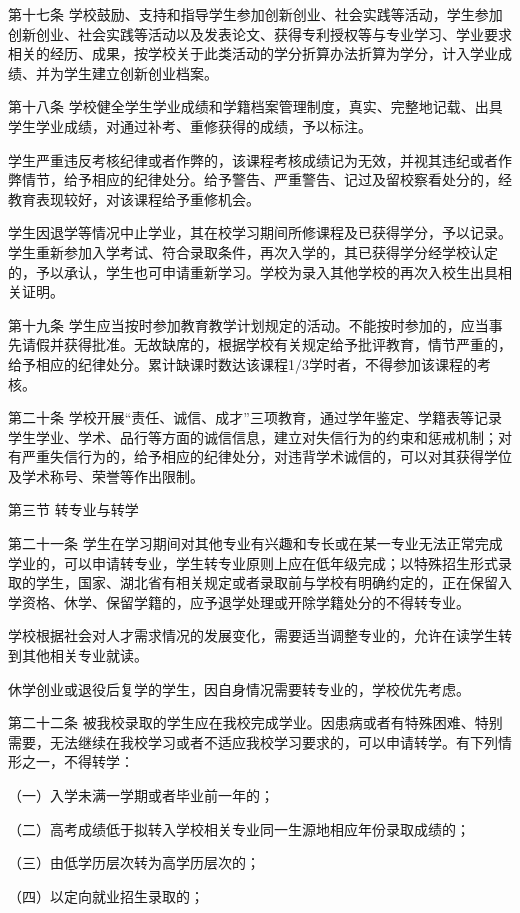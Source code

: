 \documentclass[UTF8,12pt,a4paper]{report}
\begin{document}
第十七条 学校鼓励、支持和指导学生参加创新创业、社会实践等活动，学生参加创新创业、社会实践等活动以及发表论文、获得专利授权等与专业学习、学业要求相关的经历、成果，按学校关于此类活动的学分折算办法折算为学分，计入学业成绩、并为学生建立创新创业档案。

第十八条 学校健全学生学业成绩和学籍档案管理制度，真实、完整地记载、出具学生学业成绩，对通过补考、重修获得的成绩，予以标注。

学生严重违反考核纪律或者作弊的，该课程考核成绩记为无效，并视其违纪或者作弊情节，给予相应的纪律处分。给予警告、严重警告、记过及留校察看处分的，经教育表现较好，对该课程给予重修机会。

学生因退学等情况中止学业，其在校学习期间所修课程及已获得学分，予以记录。学生重新参加入学考试、符合录取条件，再次入学的，其已获得学分经学校认定的，予以承认，学生也可申请重新学习。学校为录入其他学校的再次入校生出具相关证明。

第十九条 学生应当按时参加教育教学计划规定的活动。不能按时参加的，应当事先请假并获得批准。无故缺席的，根据学校有关规定给予批评教育，情节严重的，给予相应的纪律处分。累计缺课时数达该课程1/3学时者，不得参加该课程的考核。

第二十条 学校开展“责任、诚信、成才”三项教育，通过学年鉴定、学籍表等记录学生学业、学术、品行等方面的诚信信息，建立对失信行为的约束和惩戒机制；对有严重失信行为的，给予相应的纪律处分，对违背学术诚信的，可以对其获得学位及学术称号、荣誉等作出限制。

第三节 转专业与转学

第二十一条 学生在学习期间对其他专业有兴趣和专长或在某一专业无法正常完成学业的，可以申请转专业，学生转专业原则上应在低年级完成；以特殊招生形式录取的学生，国家、湖北省有相关规定或者录取前与学校有明确约定的，正在保留入学资格、休学、保留学籍的，应予退学处理或开除学籍处分的不得转专业。

学校根据社会对人才需求情况的发展变化，需要适当调整专业的，允许在读学生转到其他相关专业就读。

休学创业或退役后复学的学生，因自身情况需要转专业的，学校优先考虑。

第二十二条 被我校录取的学生应在我校完成学业。因患病或者有特殊困难、特别需要，无法继续在我校学习或者不适应我校学习要求的，可以申请转学。有下列情形之一，不得转学：

（一）入学未满一学期或者毕业前一年的；

（二）高考成绩低于拟转入学校相关专业同一生源地相应年份录取成绩的；

（三）由低学历层次转为高学历层次的；

（四）以定向就业招生录取的；
\end{document}
